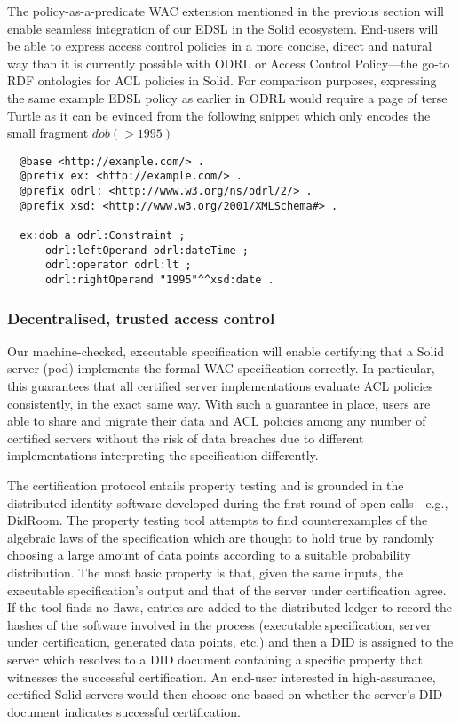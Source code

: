 The policy-as-a-predicate WAC extension mentioned in the previous
section will enable seamless integration of our EDSL in the Solid
ecosystem. End-users will be able to express access control policies
in a more concise, direct and natural way than it is currently possible
with ODRL or Access Control Policy---the go-to RDF ontologies for
ACL policies in Solid. For comparison purposes, expressing the same
example EDSL policy as earlier in ODRL would require a page of terse
Turtle as it can be evinced from the following snippet which only
encodes the small fragment $dob (> 1995)$
\begin{lstlisting}
  @base <http://example.com/> .
  @prefix ex: <http://example.com/> .
  @prefix odrl: <http://www.w3.org/ns/odrl/2/> .
  @prefix xsd: <http://www.w3.org/2001/XMLSchema#> .

  ex:dob a odrl:Constraint ;
      odrl:leftOperand odrl:dateTime ;
      odrl:operator odrl:lt ;
      odrl:rightOperand "1995"^^xsd:date .
\end{lstlisting}


\subsubsection{Decentralised, trusted access control}
Our machine-checked, executable specification will enable certifying
that a Solid server (pod) implements the formal WAC specification correctly.
In particular, this guarantees that all certified server implementations
evaluate ACL policies consistently, in the exact same way. With such
a guarantee in place, users are able to share and migrate their data
and ACL policies among any number of certified servers without the
risk of data breaches due to different implementations interpreting
the specification differently.

The certification protocol entails property testing\cite{claessen2000quickcheck}
and is grounded in the distributed identity software developed during
the first round of open calls---e.g., DidRoom. The property testing
tool attempts to find counterexamples of the algebraic laws of the
specification which are thought to hold true by randomly choosing a
large amount of data points according to a suitable probability
distribution. The most basic property is that, given the same inputs,
the executable specification's output and that of the server under
certification agree. If the tool finds no flaws, entries are added
to the distributed ledger to record the hashes of the software involved
in the process (executable specification, server under certification,
generated data points, etc.) and then a DID is assigned to the server
which resolves to a DID document containing a specific property that
witnesses the successful certification. An end-user interested in
high-assurance, certified Solid servers would then choose one based
on whether the server's DID document indicates successful certification.
